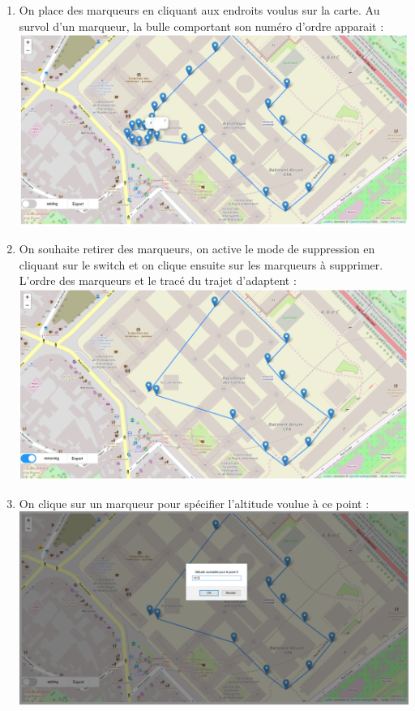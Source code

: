 \documentclass{article}
\begin{document}
\begin{enumerate}
   \item On place des marqueurs en cliquant aux endroits voulus sur la carte. Au survol d'un marqueur, la bulle comportant son numéro d'ordre apparait :\\
 \includegraphics[scale=0.42]{capt3.PNG}
  \item On souhaite retirer des marqueurs, on active le mode de suppression en cliquant sur le switch et on clique ensuite sur les marqueurs à supprimer. L'ordre des marqueurs et le tracé du trajet d'adaptent :\\
 \includegraphics[scale=0.42]{capt5.PNG}
  \item On clique sur un marqueur pour spécifier l'altitude voulue à ce point :\\
 \includegraphics[scale=0.42]{capt6.PNG}

\end{enumerate}
\end{document}
